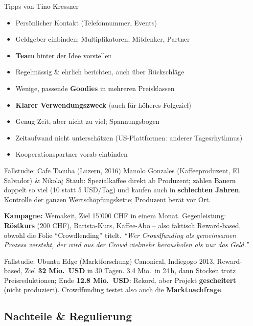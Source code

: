 \documentclass[a4paper, fontsize=7pt]{scrartcl}
\begin{document}
\begin{subbox}{Tipps von Tino Kressner}
\begin{itemize}
    \item Persönlicher Kontakt (Telefonnummer, Events)
    \item Geldgeber einbinden: Multiplikatoren, Mitdenker, Partner
    \item \textbf{Team} hinter der Idee vorstellen
    \item Regelmässig \& ehrlich berichten, auch über Rückschläge
    \item Wenige, passende \textbf{Goodies} in mehreren Preisklassen
    \item \textbf{Klarer Verwendungszweck} (auch für höheres Folgeziel)
    \item Genug Zeit, aber nicht zu viel; Spannungsbogen
    \item Zeitaufwand nicht unterschätzen (US-Plattformen: anderer
    Tagesrhythmus)
    \item Kooperationspartner vorab einbinden
\end{itemize}
\end{subbox}

\begin{subbox}{Fallstudie: Cafe Tacuba (Luzern, 2016)}
Manolo Gonzales (Kaffeeproduzent, El Salvador) \& Nikolaj Staub: Spezialkaffee
direkt ab Produzent; zahlen Bauern doppelt so viel (10 statt 5 USD/Tag) und
kaufen auch in \textbf{schlechten Jahren}. Kontrolle der ganzen
Wertschöpfungskette; Produzent berät vor Ort.

\textbf{Kampagne:} Wemakeit, Ziel 15'000 CHF in einem Monat. Gegenleistung:
\textbf{Röstkurs} (200 CHF), Barista-Kurs, Kaffee-Abo -- also faktisch
Reward-based, obwohl die Folie ``Crowdlending'' titelt.
\emph{``Wer Crowdfunding als gemeinsamen Prozess versteht, der wird aus der
Crowd vielmehr herausholen als nur das Geld.''}
\end{subbox}

\begin{subbox}{Fallstudie: Ubuntu Edge (Marktforschung)}
Canonical, Indiegogo 2013, Reward-based, Ziel \textbf{32 Mio.\ USD} in 30
Tagen. 3.4 Mio.\ in 24\,h, dann Stocken trotz Preisreduktionen; Ende
\textbf{12.8 Mio.\ USD}: Rekord, aber Projekt \textbf{gescheitert} (nicht
produziert). Crowdfunding testet also auch die \textbf{Marktnachfrage}.
\end{subbox}

\subsection{Nachteile \& Regulierung}
\end{document}
